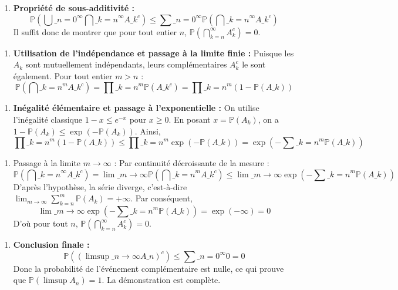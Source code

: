 \documentclass[11pt,a4paper]{article}
\begin{document}
\begin{enumerate}
\item \textbf{Propriété de sous-additivité :}
   $$ \mathbb{P}\left( \bigcup\_{n=0}^\infty \bigcap\_{k=n}^\infty A\_k^c \right) \le \sum\_{n=0}^\infty \mathbb{P}\left( \bigcap\_{k=n}^\infty A\_k^c \right) $$
   Il suffit donc de montrer que pour tout entier $n$, $\mathbb{P}\left( \bigcap_{k=n}^\infty A_k^c \right) = 0$.
\end{enumerate}

\begin{enumerate}
\item \textbf{Utilisation de l'indépendance et passage à la limite finie :}
   Puisque les $A_k$ sont mutuellement indépendants, leurs complémentaires $A_k^c$ le sont également.
   Pour tout entier $m > n$ :
   $$ \mathbb{P}\left( \bigcap\_{k=n}^m A\_k^c \right) = \prod\_{k=n}^m \mathbb{P}(A\_k^c) = \prod\_{k=n}^m (1 - \mathbb{P}(A\_k)) $$
\end{enumerate}

\begin{enumerate}
\item \textbf{Inégalité élémentaire et passage à l'exponentielle :}
   On utilise l'inégalité classique $1 - x \le e^{-x}$ pour $x \ge 0$.
   En posant $x = \mathbb{P}(A_k)$, on a $1 - \mathbb{P}(A_k) \le \exp(-\mathbb{P}(A_k))$.
   Ainsi,
   $$ \prod\_{k=n}^m (1 - \mathbb{P}(A\_k)) \le \prod\_{k=n}^m \exp(-\mathbb{P}(A\_k)) = \exp\left( - \sum\_{k=n}^m \mathbb{P}(A\_k) \right) $$
\end{enumerate}

\begin{enumerate}
\item \textit{}Passage à la limite $m \to \infty$ :\textit{}
   Par continuité décroissante de la mesure :
   $$ \mathbb{P}\left( \bigcap\_{k=n}^\infty A\_k^c \right) = \lim\_{m \to \infty} \mathbb{P}\left( \bigcap\_{k=n}^m A\_k^c \right) \le \lim\_{m \to \infty} \exp\left( - \sum\_{k=n}^m \mathbb{P}(A\_k) \right) $$
   D'après l'hypothèse, la série diverge, c'est-à-dire $\lim_{m \to \infty} \sum_{k=n}^m \mathbb{P}(A_k) = +\infty$.
   Par conséquent,
   $$ \lim\_{m \to \infty} \exp\left( - \sum\_{k=n}^m \mathbb{P}(A\_k) \right) = \exp(-\infty) = 0 $$
   D'où pour tout $n$, $\mathbb{P}\left( \bigcap_{k=n}^\infty A_k^c \right) = 0$.
\end{enumerate}

\begin{enumerate}
\item \textbf{Conclusion finale :}
   $$ \mathbb{P}\left( \left( \limsup\_{n \to \infty} A\_n \right)^c \right) \le \sum\_{n=0}^\infty 0 = 0 $$
   Donc la probabilité de l'événement complémentaire est nulle, ce qui prouve que $\mathbb{P}(\limsup A_n) = 1$. La démonstration est complète.
\end{enumerate}
\end{document}
